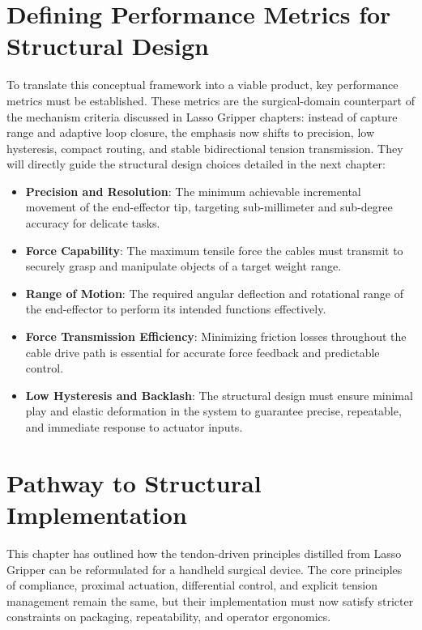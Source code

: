 \section{Defining Performance Metrics for Structural Design}

To translate this conceptual framework into a viable product, key performance metrics must be established. These metrics are the surgical-domain counterpart of the mechanism criteria discussed in Lasso Gripper chapters: instead of capture range and adaptive loop closure, the emphasis now shifts to precision, low hysteresis, compact routing, and stable bidirectional tension transmission. They will directly guide the structural design choices detailed in the next chapter:

\begin{itemize}
\item \textbf{Precision and Resolution}: The minimum achievable incremental movement of the end-effector tip, targeting sub-millimeter and sub-degree accuracy for delicate tasks.

\item \textbf{Force Capability}: The maximum tensile force the cables must transmit to securely grasp and manipulate objects of a target weight range.

\item \textbf{Range of Motion}: The required angular deflection and rotational range of the end-effector to perform its intended functions effectively.

\item \textbf{Force Transmission Efficiency}: Minimizing friction losses throughout the cable drive path is essential for accurate force feedback and predictable control.

\item \textbf{Low Hysteresis and Backlash}: The structural design must ensure minimal play and elastic deformation in the system to guarantee precise, repeatable, and immediate response to actuator inputs.
\end{itemize}

\section{Pathway to Structural Implementation}
This chapter has outlined how the tendon-driven principles distilled from Lasso Gripper can be reformulated for a handheld surgical device. The core principles of compliance, proximal actuation, differential control, and explicit tension management remain the same, but their implementation must now satisfy stricter constraints on packaging, repeatability, and operator ergonomics.

